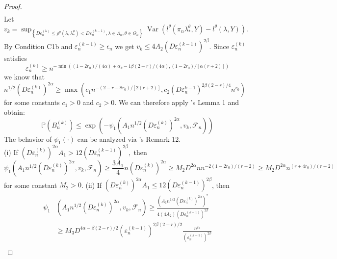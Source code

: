 \documentclass[12pt]{article}
\theoremstyle{myplain}
\theoremstyle{definition}
\theoremstyle{definition}
\theoremstyle{remark}
\numberwithin{equation}{section}
\begin{document}
\begin{proof}
\begin{equation*}
\begin{aligned}
\end{aligned}
\end{equation*}
Let $v_{k}=\sup_{\left\{D \varepsilon_{n}^{(k)} \leq \rho^\theta\left(\lambda, \lambda_*^\theta\right)<D \varepsilon_{n}^{(k-1)}, \lambda \in \Lambda_{n},\theta\in\Theta_n\right\}} \operatorname{Var}\left(l^\theta\left(\pi_{n} \lambda_*^\theta, Y\right)-l^\theta(\lambda, Y)\right)$. By Condition C1b and $\varepsilon_{n}^{(k-1)}\geq \epsilon_n$ we get $v_{k} \leq 4 A_{2}\left(D \varepsilon_{n}^{(k-1)}\right)^{2 \beta}$. Since  $\varepsilon_{n}^{(k)}$ satisfies
$$
\varepsilon_{n}^{(k)}\geq n^{-\min \left(\left(1-2 r_0\right) /(4 \alpha)+\alpha_{k}-1 \beta(2-r) /(4 \alpha),\left(1-2 r_0\right) /[\alpha(r+2)]\right)}
$$
we know that $n^{1 / 2}\left(D \varepsilon_{n}^{(k)}\right)^{2 \alpha} \geq \max \left(c_{1} n^{-\left(2-r-8 r_0\right) /[2(r+2)]}, c_{2}\left(D \varepsilon_{n}^{k-1}\right)^{2 \beta(2-r) / 4} n^{r_0}\right)$
for some constants $c_{1}>0$ and $c_{2}>0$. We can therefore apply \cite{shen1994}'s Lemma 1 and obtain:
$$
\mathbb{P}\left(B_{n}^{(k)}\right) \leq \exp \left(-\psi_{1}\left(A_{1} n^{1 / 2}\left(D \varepsilon_{n}^{(k)}\right)^{2 \alpha}, v_{k}, \mathcal{F}_{n}\right)\right)
$$
The behavior of $\psi_{1}(\cdot)$ can be analyzed via \cite{shen1994}'s Remark 12.\\
(i) If $\left(D \varepsilon_{n}^{(k)}\right)^{2 \alpha} A_{1}>12\left(D \varepsilon_{n}^{(k-1)}\right)^{2 \beta},$ then
\begin{equation*}
\psi_{1}\left(A_{1} n^{1 / 2}\left(D \varepsilon_{n}^{(k)}\right)^{2 \alpha}, v_{k}, \mathcal{F}_{n}\right) \geq \frac{3 A_{1}}{4} n\left(D \varepsilon_{n}^{(k)}\right)^{2 \alpha} \geq M_{2} D^{2 \alpha} n n^{-2\left(1-2 r_0\right) /(r+2)} \geq M_{2} D^{2 \alpha} n^{\left(r+4 r_0\right) /(r+2)}
\end{equation*}
for some constant $M_{2}>0$.
(ii) If $\left(D \varepsilon_{n}^{(k)}\right)^{2 \alpha} A_{1} \leq 12\left(D \varepsilon_{n}^{(k-1)}\right)^{2 \beta}$, then
\begin{equation*}
\begin{aligned}
\psi_{1} & \left(A_{1} n^{1 / 2}\left(D \varepsilon_{n}^{(k)}\right)^{2 \alpha}, v_{k}, \mathcal{F}_{n}\right)  \geq \frac{\left(A_{1} n^{1 / 2}\left(D \varepsilon_{n}^{(k)}\right)^{2 \alpha}\right)^{2}}{4\left(4 A_{2}\right)\left(D \varepsilon_{n}^{(k-1)}\right)^{2 \beta}} \\
& \geq M_{3} D^{4 \alpha-\beta(2-r) / 2}\left(\varepsilon_{n}^{(k-1)}\right)^{2 \beta(2-r) / 2} \frac{n^{r_0}}{\left(\varepsilon_{n}^{(k-1)}\right)^{2 \beta}} \\

\end{aligned}
\end{equation*}
\end{proof}
\end{document}
